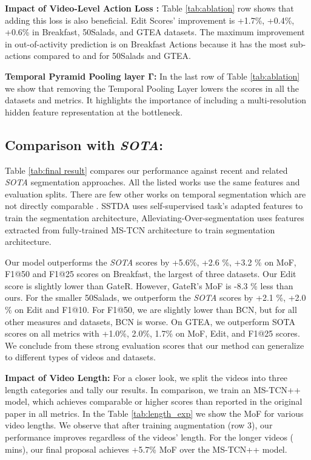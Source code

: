 \documentclass[10pt,twocolumn,letterpaper]{article}
\newcommand{\bottle}{\ensuremath{\mathbf{\Gamma}}}
\begin{document}
\textbf{Impact of Video-Level Action Loss :} Table \ref{tab:ablation} row  shows that adding this loss is also beneficial.  
Edit Scores' improvement is +1.7\%, +0.4\%, +0.6\% in Breakfast, 50Salads, and GTEA datasets. The maximum improvement in out-of-activity prediction is on Breakfast Actions because it has the most sub-actions  compared to  and  for 50Salads and GTEA.

\textbf{Temporal Pyramid Pooling layer \bottle:} In the last row of Table \ref{tab:ablation} we show that removing the Temporal Pooling Layer lowers the scores in all the datasets and metrics.  It highlights the importance of including a multi-resolution hidden feature representation at the bottleneck.

\subsection{Comparison with \textit{SOTA}:}\label{subsec:sota_comparison}
Table \ref{tab:final result} compares our performance against recent and related \textit{SOTA} segmentation approaches. All the listed works use the same  features and evaluation splits. There are few other works on temporal segmentation which are not directly comparable \cite{ishikawa2021alleviating, selfsupervised-chen2020action}. SSTDA \cite{selfsupervised-chen2020action} uses self-supervised task's adapted features to train the segmentation architecture, Alleviating-Over-segmentation \cite{ishikawa2021alleviating} uses features extracted from fully-trained MS-TCN\cite{farha2019ms} architecture to train segmentation architecture. 

Our model outperforms the \textit{SOTA} scores by +5.6\%, +2.6 \%, +3.2 \% on MoF, F1@50 and F1@25 scores on Breakfast, the largest of three datasets. Our Edit score is slightly lower than 
GateR\cite{wang2020gated}. However, GateR's MoF is -8.3 \% less than ours.  For the smaller 50Salads, we outperform the \textit{SOTA} scores by +2.1 \%, +2.0 \% on Edit and F1@10.  For F1@50, we are slightly lower than BCN\cite{wang2020boundary}, but for all other measures and datasets, BCN is worse.
On GTEA, we outperform SOTA scores on all metrics with +1.0\%, 2.0\%, 1.7\% on MoF, Edit, and F1@25 scores.  We conclude from these strong evaluation scores that our method can generalize to different types of videos and datasets. 

\textbf{Impact of Video Length:} For a closer look, we split the videos into three length categories and tally our results.  In comparison, we train an MS-TCN++\cite{li2020ms} model, which achieves comparable or higher scores than reported in the original paper in all metrics. In the Table \ref{tab:length_exp} we show the MoF  for various video lengths.  We observe that after training augmentation (row 3), our performance improves regardless of the videos' length. For the longer videos ( mins), our final proposal achieves +5.7\% MoF over the MS-TCN++ model.
\end{document}
